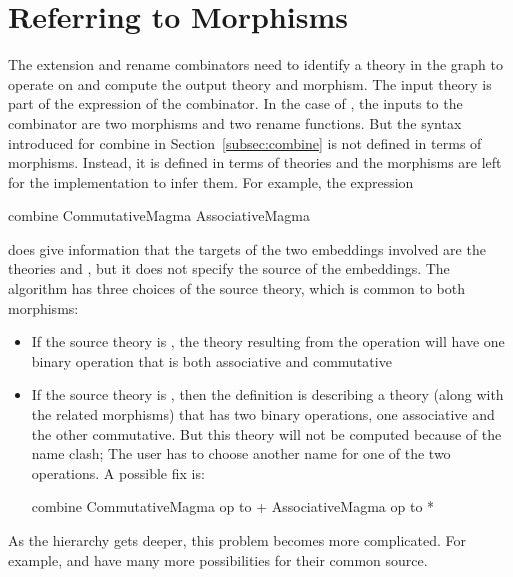 \section{Referring to Morphisms}
\label{subsec:overPart}
The extension and rename combinators need to identify a theory in the graph to operate on and compute the output theory and morphism. The input theory is part of the expression of the combinator. 
In the case of , the inputs to the combinator are two morphisms and two rename functions. But the syntax introduced for combine in Section~\ref{subsec:combine} is not defined in terms of morphisms. Instead, it is defined in terms of theories and the morphisms are left for the implementation to infer them. 
For example, the expression 
\begin{togcode}
combine CommutativeMagma {} AssociativeMagma {}
\end{togcode}
\noindent does give information that the targets of the two embeddings involved are the theories   and , but it does not specify the source of the embeddings. The algorithm has three choices of the source theory, which is common to both morphisms:  
\begin{itemize}
    \item If the source theory is , the theory resulting from the  operation will have one binary operation that is both associative and commutative 
    \item If the source theory is , then the definition is describing a theory (along with the related morphisms) that has two binary operations, one associative and the other commutative. But this theory will not be computed because of the name clash; The user has to choose another name for one of the two operations. A possible fix is:  
    \begin{togcode}
combine CommutativeMagma {op to +} AssociativeMagma {op to *}
    \end{togcode}
\end{itemize}
As the hierarchy gets deeper, this problem becomes more complicated. For example,  and  have many more possibilities for their common source. 

